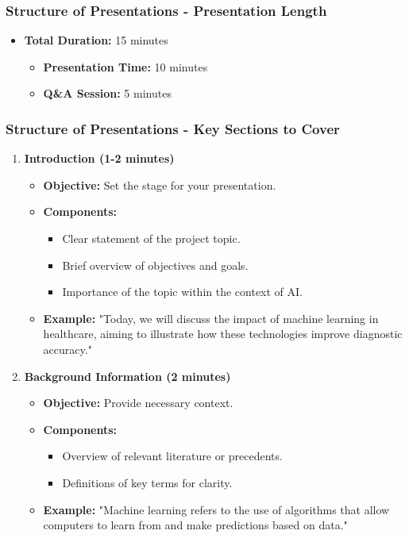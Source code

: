\documentclass[aspectratio=169]{beamer}
\begin{document}
\begin{frame}[fragile]
    \frametitle{Structure of Presentations - Presentation Length}
    \begin{itemize}
        \item \textbf{Total Duration:} 15 minutes
        \begin{itemize}
            \item \textbf{Presentation Time:} 10 minutes
            \item \textbf{Q\&A Session:} 5 minutes
        \end{itemize}
    \end{itemize}
\end{frame}

\begin{frame}[fragile]
    \frametitle{Structure of Presentations - Key Sections to Cover}
    \begin{enumerate}
        \item \textbf{Introduction (1-2 minutes)}  
        \begin{itemize}
            \item \textbf{Objective:} Set the stage for your presentation.
            \item \textbf{Components:}
            \begin{itemize}
                \item Clear statement of the project topic.
                \item Brief overview of objectives and goals.
                \item Importance of the topic within the context of AI.
            \end{itemize}
            \item \textbf{Example:} "Today, we will discuss the impact of machine learning in healthcare, aiming to illustrate how these technologies improve diagnostic accuracy."
        \end{itemize}
        
        \item \textbf{Background Information (2 minutes)}
        \begin{itemize}
            \item \textbf{Objective:} Provide necessary context.
            \item \textbf{Components:}
            \begin{itemize}
                \item Overview of relevant literature or precedents.
                \item Definitions of key terms for clarity.
            \end{itemize}
            \item \textbf{Example:} "Machine learning refers to the use of algorithms that allow computers to learn from and make predictions based on data."
        \end{itemize}
    \end{enumerate}
\end{frame}
\end{document}
